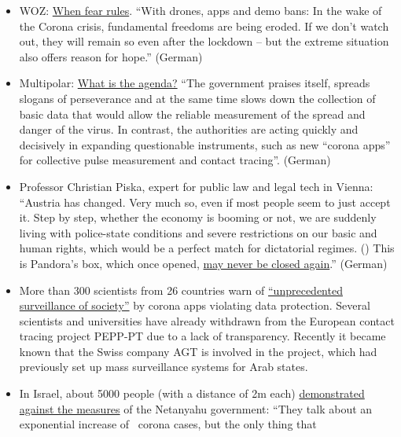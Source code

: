 \begin{itemize}
\tightlist
\item
  WOZ:
  \href{https://www.woz.ch/2016/grundrechte/wenn-die-angst-regiert}{When
  fear rules}. ``With drones, apps and demo bans: In the wake of the
  Corona crisis, fundamental freedoms are being eroded. If we don't
  watch out, they will remain so even after the lockdown -- but the
  extreme situation also offers reason for hope.'' (German)
\item
  Multipolar:
  \href{https://multipolar-magazin.de/artikel/die-massnahmen-wirken}{What
  is the agenda?} ``The government praises itself, spreads slogans of
  perseverance and at the same time slows down the collection of basic
  data that would allow the reliable measurement of the spread and
  danger of the virus. In contrast, the authorities are acting quickly
  and decisively in expanding questionable instruments, such as new
  ``corona apps'' for collective pulse measurement and contact
  tracing''. (German)
\item
  Professor Christian Piska, expert for public law and legal tech in
  Vienna: ``Austria has changed. Very much so, even if most people seem
  to just accept it. Step by step, whether the economy is booming or
  not, we are suddenly living with police-state conditions and severe
  restrictions on our basic and human rights, which would be a perfect
  match for dictatorial regimes. () This is Pandora's box, which once
  opened,
  \href{https://kurier.at/meinung/das-juristische-totschlagargument-vom-menschenleben/400814570}{may
  never be closed again}.'' (German)
\item
  More than 300 scientists from 26 countries warn of
  \href{https://www.golem.de/news/corona-app-300-wissenschaftler-warnen-vor-zentraler-datenspeicherung-2004-147973.html}{``unprecedented
  surveillance of society''} by corona apps violating data protection.
  Several scientists and universities have already withdrawn from the
  European contact tracing project PEPP-PT due to a lack of
  transparency. Recently it became known that the Swiss company AGT is
  involved in the project, which had previously set up mass surveillance
  systems for Arab states.
\item
  In Israel, about 5000 people (with a distance of 2m each)
  \href{https://edition.cnn.com/2020/04/20/middleeast/israel-protest-social-distancing-intl/index.html}{demonstrated
  against the measures} of the Netanyahu government: ``They talk about
  an exponential increase of~ corona cases, but the only thing that

\end{itemize}
